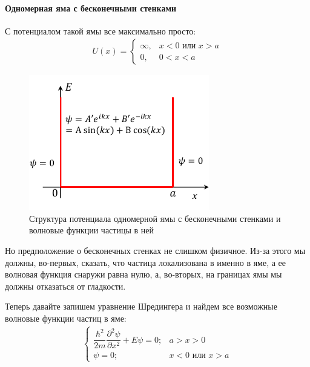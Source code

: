 \documentclass[12pt]{article}
\begin{document}
\paragraph{Одномерная яма с бесконечными стенками}
С потенциалом такой ямы все максимально просто:
\begin{gather*}
    U(x) = \begin{cases}
         \infty, &x<0 \text{ или } x>a \\
          0, &0<x<a 
    \end{cases}
\end{gather*}
\begin{figure}[h]
    \centering
    \includegraphics[width=0.7\textwidth,height=\textheight,keepaspectratio]{Seminar_04/pics/pic_03.pdf}
    \caption{Структура потенциала одномерной ямы с бесконечными стенками и волновые функции частицы в ней}
    \label{fig:sem_04_1D_inf_hole}
\end{figure}

Но предположение о бесконечных стенках не слишком физичное. Из-за этого мы должны, во-первых, сказать, что частица локализована в именно в яме, а ее волновая функция снаружи равна нулю, а, во-вторых, на границах ямы мы должны отказаться от гладкости.

Теперь давайте запишем уравнение Шредингера и найдем все возможные волновые функции частиц в яме:
\begin{gather*}
    \begin{cases}
         \dfrac{\hbar^2}{2m}\dfrac{\partial^2\psi}{\partial x^2} +  E\psi=0; &a>x>0  \\[10pt]
         \psi=0;  &x<0 \text{ или } x>a 
    \end{cases}
\end{gather*}
\end{document}
